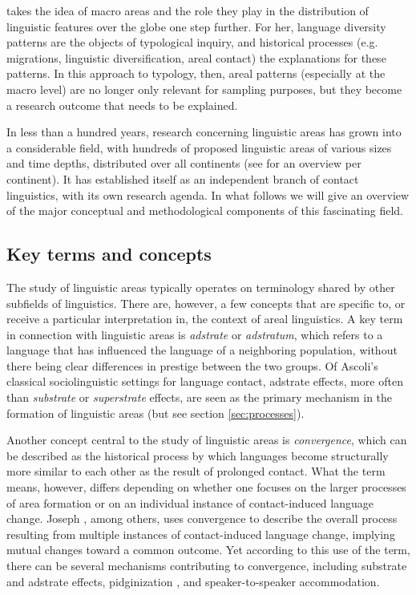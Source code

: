 \documentclass[output=paper,
modfonts
]{langscibook}
\begin{document}
\cite{Nichols1992Linguistic} takes the idea of macro areas and the role they play in the distribution of linguistic features over the globe one step further. For her, language diversity patterns are the objects of typological inquiry, and historical processes (e.g. migrations, linguistic diversification, areal contact) the explanations for these patterns.
In this approach to typology, then, areal patterns (especially at the macro level) are no longer only relevant for sampling purposes, but they become a research outcome that needs to be explained. 

In less than a hundred years, research concerning linguistic areas has grown into a considerable field, with hundreds of proposed linguistic areas of various sizes and time depths, distributed over all continents (see \textcite{vangijnetal2016linguistic} for an overview per continent). It has established itself as an independent branch of contact linguistics, with its own research agenda. In what follows we will give an overview of the major conceptual and methodological components of this fascinating field.

\subsection{Key terms and concepts}

The study of linguistic areas typically operates on terminology shared by other subfields of linguistics. There are, however, a few concepts that are specific to, or receive a particular interpretation in, the context of areal linguistics. A key term in connection with linguistic areas is \textit{adstrate} or \textit{adstratum}, which refers to a language that has influenced the language of a neighboring population, without there being clear differences in prestige between the two groups. Of Ascoli's classical sociolinguistic settings for language contact, adstrate effects, more often than \textit{substrate} or \textit{superstrate} effects, are seen as the primary mechanism in the formation of linguistic areas (but see section \ref{sec:processes}).


Another concept central to the study of linguistic areas is \textit{convergence}, which can be described as the historical process by which languages become structurally more similar to each other as the result of prolonged contact. What the term means, however, differs depending on whether one focuses on the larger processes of area formation or on an individual instance of contact-induced language change. Joseph \parencite*{joseph2010}, among others, uses convergence to describe the overall process resulting from multiple instances of contact-induced language change, implying mutual changes toward a common outcome. Yet according to this use of the term, there can be several mechanisms contributing to convergence, including substrate and adstrate effects, pidginization
, and speaker-to-speaker accommodation.
\end{document}
